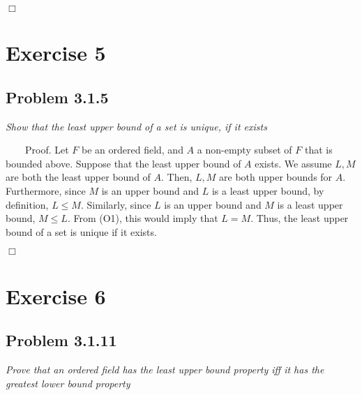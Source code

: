 \documentclass[
]{article}
\begin{document}
\hfill \(\Box\)

\hypertarget{exercise-5}{%
\section{Exercise 5}\label{exercise-5}}

\hypertarget{problem-3.1.5}{%
\subsection{Problem 3.1.5}\label{problem-3.1.5}}

\emph{Show that the least upper bound of a set is unique, if it exists}

~~~~Proof. Let \(F\) be an ordered field, and \(A\) a non-empty subset
of \(F\) that is bounded above. Suppose that the least upper bound of
\(A\) exists. We assume \(L,M\) are both the least upper bound of \(A\).
Then, \(L, M\) are both upper bounds for \(A\). Furthermore, since \(M\)
is an upper bound and \(L\) is a least upper bound, by definition,
\(L \leq M\). Similarly, since \(L\) is an upper bound and \(M\) is a
least upper bound, \(M \leq L\). From (O1), this would imply that
\(L = M\). Thus, the least upper bound of a set is unique if it exists.

\hfill \(\Box\)

\hypertarget{exercise-6}{%
\section{Exercise 6}\label{exercise-6}}

\hypertarget{problem-3.1.11}{%
\subsection{Problem 3.1.11}\label{problem-3.1.11}}

\emph{Prove that an ordered field has the least upper bound property iff
it has the greatest lower bound property}
\end{document}
